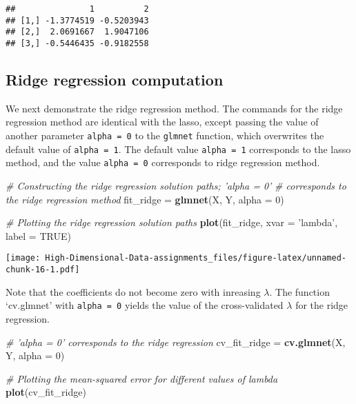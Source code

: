 \documentclass[
]{book}
\newenvironment{Shaded}{\begin{snugshade}}{\end{snugshade}}
\newcommand{\CommentTok}[1]{\textcolor[rgb]{0.56,0.35,0.01}{\textit{#1}}}
\newcommand{\DataTypeTok}[1]{\textcolor[rgb]{0.13,0.29,0.53}{#1}}
\newcommand{\DecValTok}[1]{\textcolor[rgb]{0.00,0.00,0.81}{#1}}
\newcommand{\KeywordTok}[1]{\textcolor[rgb]{0.13,0.29,0.53}{\textbf{#1}}}
\newcommand{\NormalTok}[1]{#1}
\newcommand{\OtherTok}[1]{\textcolor[rgb]{0.56,0.35,0.01}{#1}}
\newcommand{\StringTok}[1]{\textcolor[rgb]{0.31,0.60,0.02}{#1}}
\begin{document}
\begin{verbatim}
##               1          2
## [1,] -1.3774519 -0.5203943
## [2,]  2.0691667  1.9047106
## [3,] -0.5446435 -0.9182558
\end{verbatim}

\hypertarget{ridge-computation}{%
\subsection{Ridge regression computation}\label{ridge-computation}}

We next demonstrate the ridge regression method. The commands for the ridge regression method are identical with the lasso, except passing the value of another parameter \texttt{alpha\ =\ 0} to the \texttt{glmnet} function, which overwrites the default value of \texttt{alpha\ =\ 1}. The default value \texttt{alpha\ =\ 1} corresponds to the lasso method, and the value \texttt{alpha\ =\ 0} corresponds to ridge regression method.

\begin{Shaded}
\begin{Highlighting}[]
\CommentTok{# Constructing the ridge regression solution paths; 'alpha = 0'}
\CommentTok{# corresponds to the ridge regression method}
\NormalTok{fit_ridge =}\StringTok{ }\KeywordTok{glmnet}\NormalTok{(X, Y, }\DataTypeTok{alpha =} \DecValTok{0}\NormalTok{)}

\CommentTok{# Plotting the ridge regression solution paths}
\KeywordTok{plot}\NormalTok{(fit_ridge, }\DataTypeTok{xvar =} \StringTok{'lambda'}\NormalTok{, }\DataTypeTok{label =} \OtherTok{TRUE}\NormalTok{)}
\end{Highlighting}
\end{Shaded}

\texttt{[image: High-Dimensional-Data-assignments\_files/figure-latex/unnamed-chunk-16-1.pdf]}

Note that the coefficients do not become zero with inreasing \(\lambda\). The function `cv.glmnet' with \texttt{alpha\ =\ 0} yields the value of the cross-validated \(\lambda\) for the ridge regression.

\begin{Shaded}
\begin{Highlighting}[]
\CommentTok{# 'alpha = 0' corresponds to the ridge regression}
\NormalTok{cv_fit_ridge =}\StringTok{ }\KeywordTok{cv.glmnet}\NormalTok{(X, Y, }\DataTypeTok{alpha =} \DecValTok{0}\NormalTok{)}

\CommentTok{# Plotting the mean-squared error for different values of lambda}
\KeywordTok{plot}\NormalTok{(cv_fit_ridge)}
\end{Highlighting}
\end{Shaded}
\end{document}
